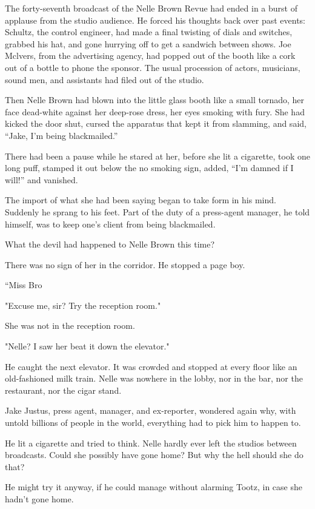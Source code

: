 \documentclass{novel}
\begin{document}
The forty-seventh broadcast of the Nelle Brown Revue had ended in a burst of applause from the studio audience. He forced his thoughts back over past events: Schultz, the control engineer, had made a final twisting of dials and switches, grabbed his hat, and gone hurrying off to get a sandwich between shows. Joe Mclvers, from the advertising agency, had popped out of the booth like a cork out of a bottle to phone the sponsor. The usual procession of actors, musicians, sound men, and assistants had filed out of the studio.

Then Nelle Brown had blown into the little glass booth like a small tornado, her face dead-white against her deep-rose dress, her eyes smoking with fury. She had kicked the door shut, cursed the apparatus that kept it from slamming, and said, “Jake, I’m being blackmailed.”

There had been a pause while he stared at her, before she lit a cigarette, took one long puff, stamped it out below the no smoking sign, added, “I’m damned if I will!” and vanished.

The import of what she had been saying began to take form in his mind. Suddenly he sprang to his feet. Part of the duty of a press-agent manager, he told himself, was to keep one’s client from being blackmailed.

What the devil had happened to Nelle Brown this time?

There was no sign of her in the corridor. He stopped a page boy.

“Miss Bro

"Excuse me, sir? Try the reception room."

She was not in the reception room.

"Nelle? I saw her beat it down the elevator."

He caught the next elevator. It was crowded and stopped at every floor like an old-fashioned milk train. Nelle was nowhere in the lobby, nor in the bar, nor the restaurant, nor the cigar stand.

Jake Justus, press agent, manager, and ex-reporter, wondered again why, with untold billions of people in the world, everything had to pick him to happen to.

He lit a cigarette and tried to think. Nelle hardly ever left the studios between broadcasts. Could she possibly have gone home? But why the hell should she do that?

He might try it anyway, if he could manage without alarming Tootz, in case she hadn't gone home.
\end{document}
